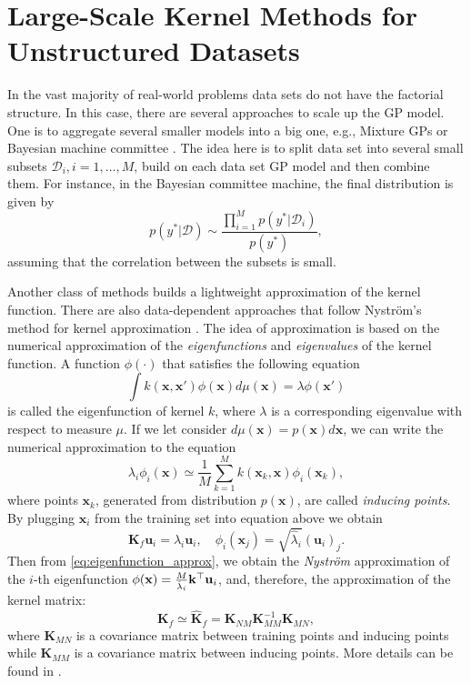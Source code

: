 \chapter{Large-Scale Kernel Methods for Unstructured Datasets}
\label{chap:unstructured_datasets}
In the vast majority of real-world problems data sets do not have the factorial structure.
In this case, there are several approaches to scale up the GP model.
One is to aggregate several smaller models into a big one,
e.g., Mixture GPs or Bayesian machine committee
\citep{rasmussen2006gaussian, rasmussen2001infinite}.
The idea here is to split data set into several small subsets
$\mathcal{D}_i, i=1, \ldots, M$, build on each data set GP model and then combine them.
For instance, in the Bayesian committee machine, the final distribution is given by
\[
    p(y^* | \mathcal{D}) \sim \frac{\prod_{i=1}^M p(y^* | \mathcal{D}_i)}{p(y^*)},
\]
assuming that the correlation between the subsets is small.

Another class of methods builds a lightweight approximation of the kernel function.
There are also data-dependent approaches that follow Nystr{\"o}m's method for kernel approximation
\citep{rasmussen2006gaussian}.
The idea of approximation is based on the numerical approximation of the {\em eigenfunctions}
and {\em eigenvalues} of the kernel function.
A function $\phi(\cdot)$ that satisfies the following equation
\[
    \int k(\mathbf{x, x}')\phi(\mathbf{x}) d\mu(\mathbf{x}) = \lambda \phi(\mathbf{x}')
\]
is called the eigenfunction of kernel $k$, where $\lambda$ is a corresponding eigenvalue
with respect to measure $\mu$.
If we let consider $d\mu(\mathbf{x}) = p(\mathbf{x})d\mathbf{x}$, we can write the
numerical approximation to the equation
\begin{equation}
\label{eq:eigenfunction_approx}
    \lambda_i \phi_i(\mathbf{x}) \simeq
    \frac{1}{M} \sum_{k=1}^M k(\mathbf{x}_k, \mathbf{x}) \phi_i(\mathbf{x}_k),
\end{equation}
where points $\mathbf{x}_k$, generated from distribution $p(\mathbf{x})$,
are called {\em inducing points}.
By plugging $\mathbf{x}_i$ from the training set into equation above we obtain
\[
    \mathbf{K}_f \mathbf{u}_i = \hat{\lambda}_i \mathbf{u}_i,
    \quad
    \phi_i(\mathbf{x}_j) = \sqrt{\hat{\lambda}_i} \left ( \mathbf{u}_i \right )_j.
\]
Then from \eqref{eq:eigenfunction_approx}, we obtain the {\em Nystr{\"o}m} approximation
of the $i$-th eigenfunction $\phi(\mathbf{x}) = \frac{M}{\hat{\lambda}_i}\mathbf{k}^\top \mathbf{u}_i$, and, therefore, the approximation of the kernel matrix:
\begin{equation}
\label{eq:nystrom_matrix}
    \mathbf{K}_f \simeq \widehat{\mathbf{K}}_f = \mathbf{K}_{NM}\mathbf{K}_{MM}^{-1}\mathbf{K}_{MN},
\end{equation}
where $\mathbf{K}_{MN}$ is a covariance matrix between training points and inducing points
while $\mathbf{K}_{MM}$ is a covariance matrix between inducing points.
More details can be found in \citep{rasmussen2006gaussian}.

